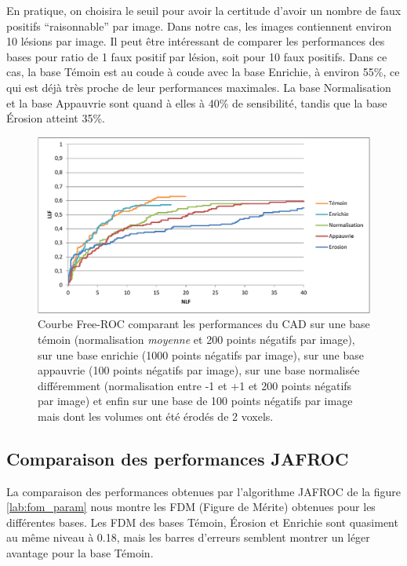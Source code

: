 En pratique, on choisira le seuil pour avoir la certitude d'avoir un nombre de faux positifs ``raisonnable'' par image. Dans notre cas, les images contiennent environ 10 lésions par image. Il peut être intéressant de comparer les performances des bases pour ratio de 1 faux positif par lésion, soit pour 10 faux positifs. Dans ce cas, la base Témoin est au coude à coude avec la base Enrichie, à environ 55\%, ce qui est déjà très proche de leur performances maximales. La base Normalisation et la base Appauvrie sont quand à elles à 40\% de sensibilité, tandis que la base Érosion atteint 35\%.


\begin{figure}[h!]
 
 \begin{center}
   \includegraphics[width=15cm]{images/FROC_param}
 \end{center}
 \label{lab:froc_comp_static}
 \caption{Courbe Free-ROC comparant les performances du CAD sur une base témoin (normalisation \emph{moyenne} et 200 points négatifs par image), sur une base enrichie (1000 points négatifs par image), sur une base appauvrie (100 points négatifs par image), sur une base normalisée différemment (normalisation entre -1 et +1 et 200 points négatifs par image) et enfin sur une base de 100 points négatifs par image mais dont les volumes ont été érodés de 2 voxels.}

\end{figure}


\subsection{Comparaison des performances JAFROC}

La comparaison des performances obtenues par l'algorithme JAFROC \cite{chakraborty1990free} de la figure \ref{lab:fom_param} nous montre les FDM (Figure de Mérite) obtenues pour les différentes bases. Les FDM des bases Témoin, Érosion et Enrichie sont quasiment au même niveau à 0.18, mais les barres d'erreurs semblent montrer un léger avantage pour la base Témoin.


